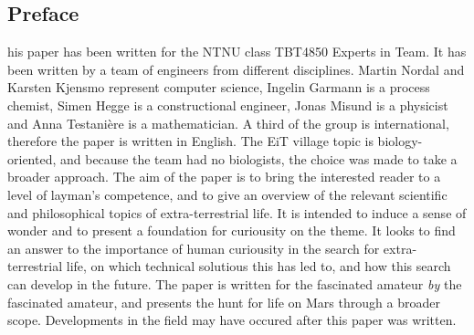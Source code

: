 \subsection{Preface}
his paper has been written for the NTNU class TBT4850 Experts in Team.
It has been written by a team of engineers from different disciplines.
Martin Nordal and Karsten Kjensmo represent computer science, Ingelin Garmann is a process chemist, Simen Hegge is a constructional engineer, Jonas Misund is a physicist and Anna Testani\`{e}re is a mathematician.
A third of the group is international, therefore the paper is written in English. 
The EiT village topic is biology-oriented, and because the team had no biologists, the choice was made to take a broader approach. 
The aim of the paper is to bring the interested reader to a level of layman's competence, and to give an overview of the relevant scientific and philosophical topics of extra-terrestrial life.
It is intended to induce a sense of wonder and to present a foundation for curiousity on the theme. It looks to find an answer to the importance of human curiousity in the search for extra-terrestrial life, on which technical solutious this has led to, and how this search can develop in the future.  
The paper is written for the fascinated amateur \emph{by} the fascinated amateur, and presents the hunt for life on Mars through a broader scope. 
Developments in the field may have occured after this paper was written. 
 